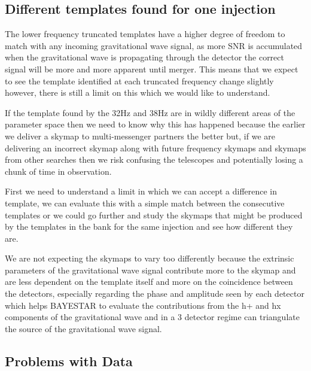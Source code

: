 \subsection{Different templates found for one injection}

The lower frequency truncated templates have a higher degree of freedom to match with any incoming gravitational wave signal, as more SNR is accumulated when the gravitational wave is propagating through the detector the correct signal will be more and more apparent until merger. This means that we expect to see the template identified at each truncated frequency change slightly however, there is still a limit on this which we would like to understand.

If the template found by the 32Hz and 38Hz are in wildly different areas of the parameter space then we need to know why this has happened because the earlier we deliver a skymap to multi-messenger partners the better but, if we are delivering an incorrect skymap along with future frequency skymaps and skymaps from other searches then we risk confusing the telescopes and potentially losing a chunk of time in observation.

First we need to understand a limit in which we can accept a difference in template, we can evaluate this with a simple match between the consecutive templates or we could go further and study the skymaps that might be produced by the templates in the bank for the same injection and see how different they are.

We are not expecting the skymaps to vary too differently because the extrinsic parameters of the gravitational wave signal contribute more to the skymap and are less dependent on the template itself and more on the coincidence between the detectors, especially regarding the phase and amplitude seen by each detector which helps BAYESTAR to evaluate the contributions from the h+ and hx components of the gravitational wave and in a 3 detector regime can triangulate the source of the gravitational wave signal.

\subsection{Problems with Data}

